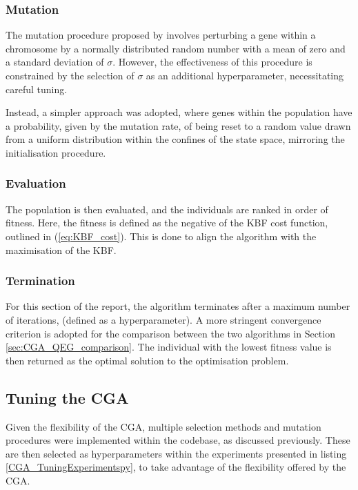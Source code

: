 \documentclass[10pt]{article}
\begin{document}
\begin{multicols}{2}
\subsubsection{Mutation}

The mutation procedure proposed by \cite{PGA} involves perturbing a gene within a chromosome by a normally distributed random number with a mean of zero and a standard deviation of $\sigma$. However, the effectiveness of this procedure is constrained by the selection of $\sigma$ as an additional hyperparameter, necessitating careful tuning. 

Instead, a simpler approach was adopted, where genes within the population have a probability, given by the mutation rate, of being reset to a random value drawn from a uniform distribution within the confines of the state space, mirroring the initialisation procedure.

\subsubsection{Evaluation}

The population is then evaluated, and the individuals are ranked in order of fitness. Here, the fitness is defined as the negative of the KBF cost function, outlined in (\ref{eq:KBF_cost}). This is done to align the algorithm with the maximisation of the KBF.

\subsubsection{Termination}

For this section of the report, the algorithm terminates after a maximum number of iterations, (defined as a hyperparameter). A more stringent convergence criterion is adopted for the comparison between the two algorithms in Section \ref{sec:CGA_QEG_comparison}. The individual with the lowest fitness value is then returned as the optimal solution to the optimisation problem.

\subsection{Tuning the CGA}
\label{sec:CGA_selection_mutation}

Given the flexibility of the CGA, multiple selection methods and mutation procedures were implemented within the codebase, as discussed previously. These are then selected as hyperparameters within the experiments presented in listing \ref{CGA_TuningExperimentspy}, to take advantage of the flexibility offered by the CGA. 


\end{multicols}
\end{document}
